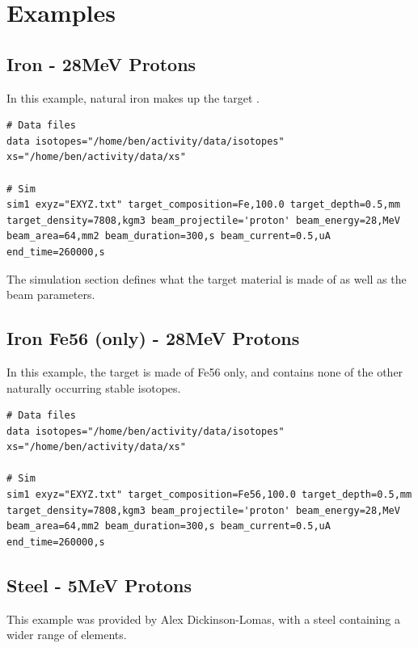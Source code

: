 \documentclass[12pt,twoside]{manual}
\begin{document}
\chapter{Examples}

\section{Iron - 28MeV Protons}

In this example, natural iron makes up the target . 

\begin{lstlisting}[style=inputfile, caption={}]
# Data files
data isotopes="/home/ben/activity/data/isotopes" xs="/home/ben/activity/data/xs"

# Sim
sim1 exyz="EXYZ.txt" target_composition=Fe,100.0 target_depth=0.5,mm target_density=7808,kgm3 beam_projectile='proton' beam_energy=28,MeV beam_area=64,mm2 beam_duration=300,s beam_current=0.5,uA end_time=260000,s
\end{lstlisting}

The simulation section defines what the target material is made of as well as the beam parameters.  



\section{Iron Fe56 (only) - 28MeV Protons}

In this example, the target is made of Fe56 only, and contains none of the other naturally occurring stable isotopes.

\begin{lstlisting}[style=inputfile, caption={}]
# Data files
data isotopes="/home/ben/activity/data/isotopes" xs="/home/ben/activity/data/xs"

# Sim
sim1 exyz="EXYZ.txt" target_composition=Fe56,100.0 target_depth=0.5,mm target_density=7808,kgm3 beam_projectile='proton' beam_energy=28,MeV beam_area=64,mm2 beam_duration=300,s beam_current=0.5,uA end_time=260000,s
\end{lstlisting}



\section{Steel - 5MeV Protons}

This example was provided by Alex Dickinson-Lomas, with a steel containing a wider range of elements.
\end{document}
